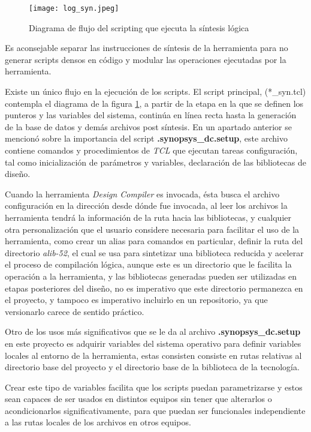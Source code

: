 \begin{figure}[h]
\texttt{[image: log\_syn.jpeg]}
\centering
\caption{Diagrama de flujo del scripting que ejecuta la síntesis lógica}
\label{s_syn}
\end{figure}



Es aconsejable separar las instrucciones de síntesis de la herramienta para no generar scripts densos en código y modular las operaciones ejecutadas por la herramienta.

Existe un único flujo en la ejecución de los scripts. El script principal, (*\_syn.tcl) contempla el diagrama de la figura \ref{s_syn}, a partir de la etapa en la que se definen los punteros y las variables del sistema, continúa en línea recta hasta la generación de la base de datos y demás archivos post síntesis. En un apartado anterior se mencionó sobre la importancia del script \textbf{.synopsys\_dc.setup}, este archivo contiene comandos y procedimientos de \textit{TCL} que ejecutan tareas configuración, tal como inicialización de parámetros y variables, declaración de las bibliotecas de diseño.

Cuando la herramienta \textit{Design Compiler} es invocada, ésta busca el archivo configuración en la dirección desde dónde fue invocada, al leer los archivos la herramienta tendrá la información de la ruta hacia las bibliotecas, y cualquier otra personalización que el usuario considere necesaria para facilitar el uso de la herramienta, como crear un alias para comandos en particular, definir la ruta del directorio \textit{alib-52}, el cual se usa para sintetizar una biblioteca reducida y acelerar el proceso de compilación lógica, aunque este es un directorio que le facilita la operación a la herramienta, y las bibliotecas generadas pueden ser utilizadas en etapas posteriores del diseño, no es imperativo que este directorio permanezca en el proyecto, y tampoco es imperativo incluirlo en un repositorio, ya que versionarlo carece de sentido práctico.

Otro de los usos más significativos que se le da al archivo \textbf{.synopsys\_dc.setup} en este proyecto es adquirir variables del sistema operativo para definir variables locales al entorno de la herramienta, estas consisten consiste en rutas relativas al directorio base del proyecto y el directorio base de la biblioteca de la tecnología.

Crear este tipo de variables facilita que los scripts puedan parametrizarse y estos sean capaces de ser usados en distintos equipos sin tener que alterarlos o acondicionarlos significativamente, para que puedan ser funcionales independiente a las rutas locales de los archivos en otros equipos.

